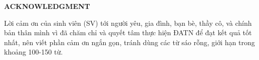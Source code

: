 \begin{center}
    \Large{\textbf{ACKNOWLEDGMENT}}\\
\end{center}
\vspace{1cm}
Lời cảm ơn của sinh viên (SV) tới người yêu, gia đình, bạn bè, thầy cô, và chính bản thân mình vì đã chăm chỉ và quyết tâm thực hiện ĐATN để đạt kết quả tốt nhất, nên viết phần cảm ơn ngắn gọn, tránh dùng các từ sáo rỗng, giới hạn trong khoảng 100-150 từ. 
